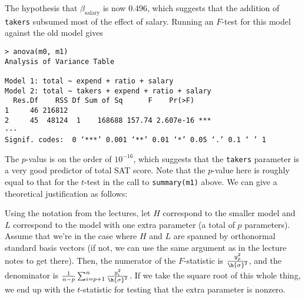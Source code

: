 \documentclass{article}
\begin{document}
The hypothesis that $\beta_\text{salary}$ is now $0.496$, which suggests that the addition of \verb|takers| subsumed most of the effect of salary. Running an $F$-test for this model against the old model gives
\begin{verbatim}
> anova(m0, m1)
Analysis of Variance Table

Model 1: total ~ expend + ratio + salary
Model 2: total ~ takers + expend + ratio + salary
  Res.Df    RSS Df Sum of Sq      F    Pr(>F)    
1     46 216812                                  
2     45  48124  1    168688 157.74 2.607e-16 ***
---
Signif. codes:  0 ‘***’ 0.001 ‘**’ 0.01 ‘*’ 0.05 ‘.’ 0.1 ‘ ’ 1
\end{verbatim}

The $p$-valus is on the order of $10^{-16}$, which suggests that the \verb|takers| parameter is a very good predictor of total SAT score. Note that the $p$-value here is roughly equal to that for the $t$-test in the call to \verb|summary(m1)| above. We can give a theoretical justification as follows: 

Using the notation from the lectures, let $H$ correspond to the smaller model and $L$ correspond to the model with one extra parameter (a total of $p$ parameters). Assume that we're in the case where $H$ and $L$ are spanned by orthonormal standard basis vectors (if not, we can use the same argument as in the lecture notes to get there). Then, the numerator of the $F$-statistic is $\frac{y_{p}^2}{\h{\sigma}^2}$, and the denominator is $\frac{1}{n-p}\sum_{i=p+1}^n\frac{y_i^2}{\h{\sigma}^2}$. If we take the square root of this whole thing, we end up with the $t$-statistic for testing that the extra parameter is nonzero. 
\end{document}
